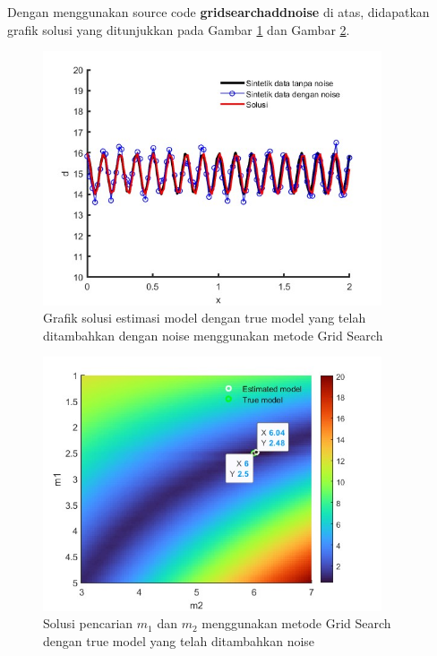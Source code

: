 \documentclass{article}
\begin{document}
Dengan menggunakan source code \textbf{gridsearch\textunderscore addnoise} di atas, didapatkan grafik solusi yang ditunjukkan pada Gambar \ref{fig: gs noise sol} dan Gambar \ref{fig:gs noise truemod}.
\begin{figure}[h]
    \centering
    \includegraphics[width=10cm]{figure/gs noise true solution.jpg}
    \caption{Grafik solusi estimasi model dengan true model yang telah ditambahkan dengan noise menggunakan metode Grid Search}
    \label{fig: gs noise sol}
\end{figure}
\begin{figure}[h]
    \centering
    \includegraphics[width=10cm]{figure/gs noise true model.jpg}
    \caption{Solusi pencarian $m_1$ dan $m_2$ menggunakan metode Grid Search dengan true model yang telah ditambahkan noise}
    \label{fig:gs noise truemod}
\end{figure}
\end{document}
